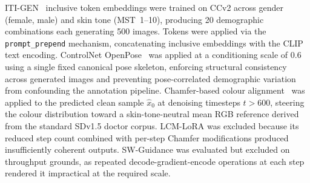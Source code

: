 ITI-GEN~\cite{Zhang_2023_ITIGEN} inclusive token embeddings were trained on CCv2 across
gender (female, male) and skin tone (MST~1--10), producing 20 demographic combinations
each generating 500 images. Tokens were applied via the \texttt{prompt\_prepend}
mechanism, concatenating inclusive embeddings with the CLIP text encoding. ControlNet
OpenPose~\cite{LZhang_2023_ControlNet} was applied at a conditioning scale of 0.6 using
a single fixed canonical pose skeleton, enforcing structural consistency across generated
images and preventing pose-correlated demographic variation from confounding the
annotation pipeline. Chamfer-based colour alignment~\cite{Shum_2025_ColorAlignment} was
applied to the predicted clean sample $\hat{x}_0$ at denoising timesteps $t > 600$,
steering the colour distribution toward a skin-tone-neutral mean RGB reference derived
from the standard SDv1.5 doctor corpus. LCM-LoRA was excluded because its reduced step
count combined with per-step Chamfer modifications produced insufficiently coherent
outputs. SW-Guidance was evaluated but excluded on throughput grounds, as repeated
decode-gradient-encode operations at each step rendered it impractical at the required
scale.